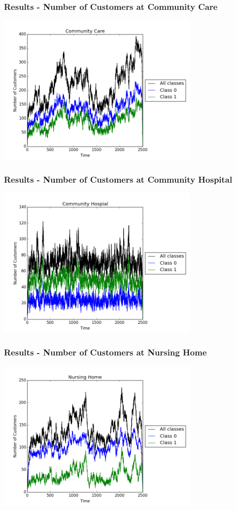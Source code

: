\documentclass{beamer}
\begin{document}
\begin{frame}
	\frametitle{Results - Number of Customers at Community Care}
  \includegraphics[width=10cm]{Images/cfm_example_CommunityCare}
\end{frame}

\begin{frame}
	\frametitle{Results - Number of Customers at Community Hospital}
  \includegraphics[width=10cm]{Images/cfm_example_CommunityHospital}
\end{frame}

\begin{frame}
	\frametitle{Results - Number of Customers at Nursing Home}
  \includegraphics[width=10cm]{Images/cfm_example_NursingHome}
\end{frame}
\end{document}
